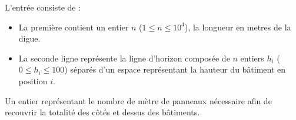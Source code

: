 \begin{Input}
	L'entrée consiste de :
	\begin{itemize}
		\item La première contient un entier $n$ ($1 \le n \le 10^4$), la longueur en metres de la digue.
		\item La seconde ligne représente la ligne d'horizon composée de $n$ entiers $h_i$ ($0 \le h_i \le 100$) séparés d'un espace représentant la hauteur du bâtiment en position $i$.
	\end{itemize}
\end{Input}

\begin{Output}
	Un entier représentant le nombre de mètre de panneaux nécessaire afin de recouvrir la totalité des côtés et dessus des bâtiments.
\end{Output}

